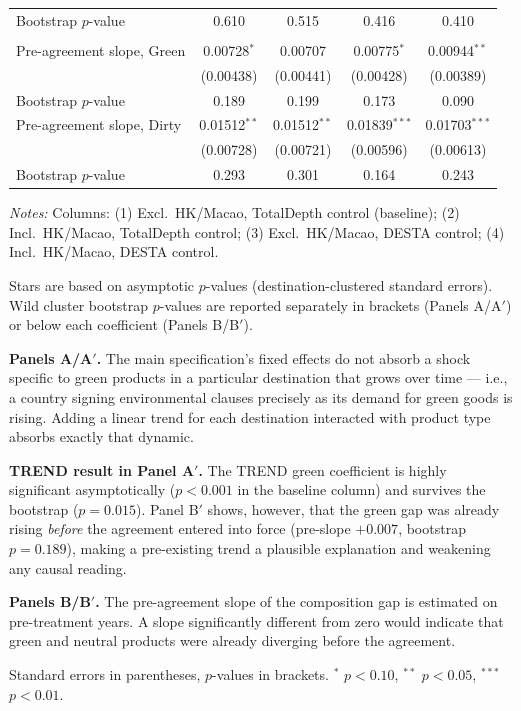 \documentclass{article}
\begin{document}
\begin{table}[htbp]
\begin{threeparttable}
\begin{tabular}{lcccc}
\quad Bootstrap $p$-value & 0.610 & 0.515 & 0.416 & 0.410 \\
\addlinespace
\multicolumn{5}{l}{\textit{Panel B$'$ --- pre-trend test (TREND index)}} \\
\addlinespace
Pre-agreement slope, Green & 0.00728$^{*}$ & 0.00707 & 0.00775$^{*}$ & 0.00944$^{**}$ \\
 & (0.00438) & (0.00441) & (0.00428) & (0.00389) \\
\quad Bootstrap $p$-value & 0.189 & 0.199 & 0.173 & 0.090 \\
\addlinespace
Pre-agreement slope, Dirty & 0.01512$^{**}$ & 0.01512$^{**}$ & 0.01839$^{***}$ & 0.01703$^{***}$ \\
 & (0.00728) & (0.00721) & (0.00596) & (0.00613) \\
\quad Bootstrap $p$-value & 0.293 & 0.301 & 0.164 & 0.243 \\
\bottomrule
\end{tabular}
\begin{tablenotes}[flushleft]\footnotesize
\item \emph{Notes:} Columns: (1) Excl.\ HK/Macao, TotalDepth control (baseline); (2) Incl.\ HK/Macao, TotalDepth control; (3) Excl.\ HK/Macao, DESTA control; (4) Incl.\ HK/Macao, DESTA control.
\item Stars are based on asymptotic $p$-values (destination-clustered standard errors). Wild cluster bootstrap $p$-values are reported separately in brackets (Panels A/A$'$) or below each coefficient (Panels B/B$'$).
\item \textbf{Panels A/A$'$.} The main specification's fixed effects do not absorb a shock specific to green products in a particular destination that grows over time --- i.e., a country signing environmental clauses precisely as its demand for green goods is rising. Adding a linear trend for each destination interacted with product type absorbs exactly that dynamic.
\item \textbf{TREND result in Panel A$'$.} The TREND green coefficient is highly significant asymptotically ($p < 0.001$ in the baseline column) and survives the bootstrap ($p = 0.015$). Panel B$'$ shows, however, that the green gap was already rising \emph{before} the agreement entered into force (pre-slope $+0.007$, bootstrap $p = 0.189$), making a pre-existing trend a plausible explanation and weakening any causal reading.
\item \textbf{Panels B/B$'$.} The pre-agreement slope of the composition gap is estimated on pre-treatment years. A slope significantly different from zero would indicate that green and neutral products were already diverging before the agreement.
\item Standard errors in parentheses, $p$-values in brackets. $^{*}$ $p<0.10$, $^{**}$ $p<0.05$, $^{***}$ $p<0.01$.
\end{tablenotes}
\end{threeparttable}
\end{table}
\end{document}
